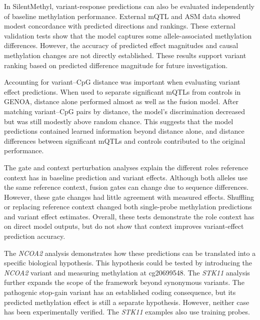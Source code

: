 \documentclass[11pt,letterpaper]{article}
\begin{document}
In SilentMethyl, variant-response predictions can also be evaluated independently of baseline methylation performance. External mQTL and ASM data showed modest concordance with predicted directions and rankings. These external validation tests show that the model captures some allele-associated methylation differences. However, the accuracy of predicted effect magnitudes and causal methylation changes are not directly established. These results support variant ranking based on predicted difference magnitude for future investigation. 

Accounting for variant--CpG distance was important when evaluating variant effect predictions. When used to separate significant mQTLs from controls in GENOA, distance alone performed almost as well as the fusion model. After matching variant--CpG pairs by distance, the model's discrimination decreased but was still modestly above random chance. This suggests that the model predictions contained learned information beyond distance alone, and distance differences between significant mQTLs and controls contributed to the original performance. 

The gate and context perturbation analyses explain the different roles reference context has in baseline prediction and variant effects. Although both alleles use the same reference context, fusion gates can change due to sequence differences. However, these gate changes had little agreement with measured effects. Shuffling or replacing reference context changed both single-probe methylation predictions and variant effect estimates. Overall, these tests demonstrate the role context has on direct model outputs, but do not show that context improves variant-effect prediction accuracy.    

The \textit{NCOA2} analysis demonstrates how these predictions can be translated into a specific biological hypothesis. This hypothesis could be tested by introducing the \textit{NCOA2} variant and measuring methylation at cg20699548. The \textit{STK11} analysis further expands the scope of the framework beyond synonymous variants. The pathogenic stop-gain variant has an established coding consequence, but its predicted methylation effect is still a separate hypothesis. However, neither case has been experimentally verified. The \textit{STK11} examples also use training probes.
\end{document}

